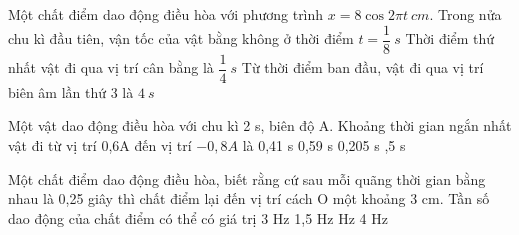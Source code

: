 \begin{ex}
Một chất điểm dao động điều hòa với phương trình $x=8 \cos 2 \pi t\ cm$.
{Trong nửa chu kì đầu tiên, vận tốc của vật bằng không ở thời điểm $t=\dfrac{1}{8} \ s$}
{\True Thời điểm thứ nhất vật đi qua vị trí cân bằng là $\dfrac{1}{4} \ s$}
{Từ thời điểm ban đầu, vật đi qua vị trí biên âm lần thứ 3 là $4 \ s$}
\loigiai{
\begin{itemchoice}
\itemch
\itemch
\itemch
\itemch
\end{itemchoice}
}
\end{ex} 
\begin{ex}%
Một vật dao động điều hòa với chu kì 2 s, biên độ A. Khoảng thời gian ngắn nhất vật đi từ vị trí 0,6A đến vị trí $-0,8A$ là
\choice
{0,41 s}
{0,59 s}
{0,205 s}
{,5 s}

\end{ex} 
\begin{ex}%
Một chất điểm dao động điều hòa, biết rằng cứ sau mỗi quãng thời gian bằng nhau là 0,25 giây thì chất điểm lại đến vị trí cách O một khoảng 3 cm. Tần số dao động của chất điểm có thể có giá trị
\choice
{3 Hz}
{1,5 Hz}
{ Hz}
{4 Hz}
\end{ex} 
